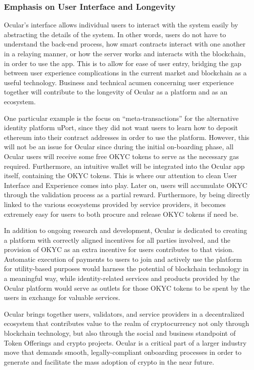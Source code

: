 \documentclass[a4paper]{article}
\begin{document}
\subsubsection*{Emphasis on User Interface and Longevity}
Ocular's interface allows individual users to interact with the system easily by abstracting the details of the system. In other words, users do not have to understand the back-end process, how smart contracts interact with one another in a relaying manner, or how the server works and interacts with the blockchain, in order to use the app. This is to allow for ease of user entry, bridging the gap between user experience complications in the current market and blockchain as a useful technology. Business and technical acumen concerning user experience together will contribute to the longevity of Ocular as a platform and as an ecosystem.

One particular example is the focus on ``meta-transactions'' for the alternative identity platform uPort, since they did not want users to learn how to deposit ethereum into their contract addresses in order to use the platform. However, this will not be an issue for Ocular since during the initial on-boarding phase, all Ocular users will receive some free OKYC tokens to serve as the necessary gas required. Furthermore, an intuitive wallet will be integrated into the Ocular app itself, containing the OKYC tokens. This is where our attention to clean User Interface and Experience comes into play. Later on, users will accumulate OKYC through the validation process as a partial reward. Furthermore, by being directly linked to the various ecosystems provided by service providers, it becomes extremely easy for users to both procure and release OKYC tokens if need be.  

In addition to ongoing research and development, Ocular is dedicated to creating a platform with correctly aligned incentives for all parties involved, and the provision of OKYC as an extra incentive for users contributes to that vision. Automatic execution of payments to users to join and actively use the platform for utility-based purposes would harness the potential of blockchain technology in a meaningful way, while identity-related services and products provided by the Ocular platform would serve as outlets for those OKYC tokens to be spent by the users in exchange for valuable services. 

Ocular brings together users, validators, and service providers in a decentralized ecosystem that contributes value to the realm of cryptocurrency not only through blockchain technology, but also through the social and business standpoint of Token Offerings and crypto projects. Ocular is a critical part of a larger industry move that demands smooth, legally-compliant onboarding processes in order to generate and facilitate the mass adoption of crypto in the near future.
\end{document}
